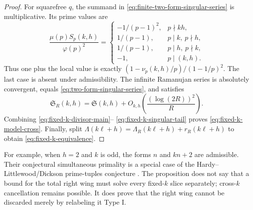 \begin{proof}
For squarefree $q$, the summand in
\eqref{eq:finite-two-form-singular-series} is multiplicative.  Its prime
values are
\begin{equation}
 \frac{\mu(p)S_p(k,h)}{\varphi(p)^2}
 =\begin{cases}
 -1/(p-1)^2,&p\nmid kh,\\
 1/(p-1),&p\mid k,\ p\nmid h,\\
 1/(p-1),&p\mid h,\ p\nmid k,\\
 -1,&p\mid(k,h).
 \end{cases}
 \label{eq:fixed-k-local-Ramanujan-values}
\end{equation}
Thus one plus the local value is exactly
$(1-\nu_p(k,h)/p)/(1-1/p)^2$.  The last case is absent under
admissibility.  The infinite Ramanujan series is absolutely convergent,
equals \eqref{eq:two-form-singular-series}, and satisfies
\begin{equation}
 \mathfrak S_R(k,h)=\mathfrak S(k,h)
 +O_{k,h}\left(\frac{(\log(2R))^2}{R}\right).
 \label{eq:fixed-k-singular-tail}
\end{equation}
Combining \eqref{eq:fixed-k-divisor-main}--
\eqref{eq:fixed-k-singular-tail} proves
\eqref{eq:fixed-k-model-cross}.  Finally, split
$\Lambda(k\ell+h)=\Lambda_R(k\ell+h)+r_R(k\ell+h)$ to obtain
\eqref{eq:fixed-k-equivalence}.
\end{proof}

For example, when $h=2$ and $k$ is odd, the forms $n$ and $kn+2$ are
admissible.  Their conjectural simultaneous primality is a special case of
the Hardy--Littlewood/Dickson prime-tuples conjecture
\citep{HardyLittlewood1923}.  The proposition does not say that a bound
for the total right wing must solve every fixed-$k$ slice separately;
cross-$k$ cancellation remains possible.  It does prove that the right
wing cannot be discarded merely by relabeling it Type I.
